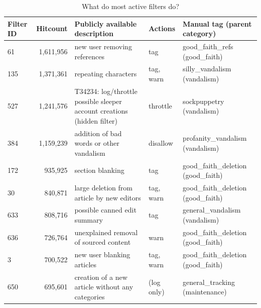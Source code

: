 \begin{table}[t]
  \centering
    \begin{tabular}{p{1cm} r p{5cm} p{2cm} p{3cm}}
        Filter ID & Hitcount & Publicly available description & Actions & Manual tag (parent category) \\
    \hline
        61 & 1,611,956 & new user removing references & tag & good\_faith\_refs (good\_faith) \\
        135 & 1,371,361 & repeating characters & tag, warn & silly\_vandalism (vandalism)\\
        527 & 1,241,576 & T34234: log/throttle possible sleeper account creations (hidden filter) & throttle & sockpuppetry (vandalism) \\
        384 & 1,159,239 & addition of bad words or other vandalism & disallow & profanity\_vandalism (vandalism) \\
        172 & 935,925 & section blanking & tag & good\_faith\_deletion (good\_faith) \\
        30 & 840,871 & large deletion from article by new editors & tag, warn & good\_faith\_deletion (good\_faith) \\
        633 & 808,716 & possible canned edit summary & tag & general\_vandalism (vandalism) \\
        636 & 726,764 & unexplained removal of sourced content & warn & good\_faith\_deletion (good\_faith) \\
        3 & 700,522 & new user blanking articles & tag, warn & good\_faith\_deletion (good\_faith) \\
        650 & 695,601 & creation of a new article without any categories & (log only) & general\_tracking (maintenance) \\
  \end{tabular}
  \caption{What do most active filters do?}~\label{tab:most-active-actions}
\end{table}

